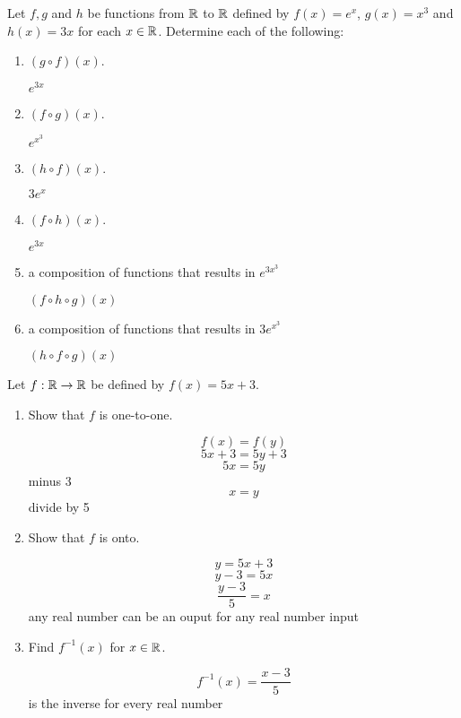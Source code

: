 \documentclass{homework}
\begin{document}
\question Let $f, g$ and $h$ be functions from $\mathbb{R}$ to $\mathbb{R}$ deﬁned by \smallbreak 
$f(x) = e^x$, \smallbreak
$g(x) = x^3$ and \smallbreak
$h(x) = 3x$ \smallbreak
for each $x \in \mathbb{R}$. Determine each of the following:
\begin{enumerate}[label=(\alph*)]
    \item $(g \circ f )(x).$
      \begin{sol}
          $e^{3x}$
      \end{sol}
    \item $(f \circ g)(x).$
      \begin{sol}
        $e^{x^3}$
      \end{sol}
    \item $(h \circ f )(x).$
      \begin{sol}
          $3e^x$
      \end{sol}
    \item $(f \circ h)(x).$
      \begin{sol}
          $e^{3x}$
      \end{sol}
    \item a composition of functions that results in $e^{3x^3}$
      \begin{sol}
          $(f \circ h \circ g)(x)$
      \end{sol}
    \item a composition of functions that results in $3e^{x^3}$
      \begin{sol}
          $(h \circ f \circ g)(x)$
      \end{sol}
\end{enumerate}

\question Let $f: \mathbb{R} \rightarrow \mathbb{R}$ be deﬁned by $f(x) = 5x + 3$.
\begin{enumerate}
    \item Show that $f$ is one-to-one.
      \begin{sol}
        \[f(x)=f(y)\] \smallbreak
        \[5x+3=5y+3\] \smallbreak
        \[5x=5y\] minus 3 \smallbreak
        \[x=y\] divide by 5\smallbreak
      \end{sol}
    \item Show that $f$ is onto.
      \begin{sol}
        \[y=5x+3\] \smallbreak
        \[y-3=5x\] \smallbreak
        \[\frac{y-3}{5}=x\] \smallbreak
        any real number can be an ouput for any real number input
      \end{sol}
    \item Find $f^{-1}(x)$ for $x \in \mathbb{R}$.
      \begin{sol}
        \[f^{-1}(x)=\frac{x-3}{5}\] \smallbreak
        is the inverse for every real number
      \end{sol}
\end{enumerate}
\end{document}
